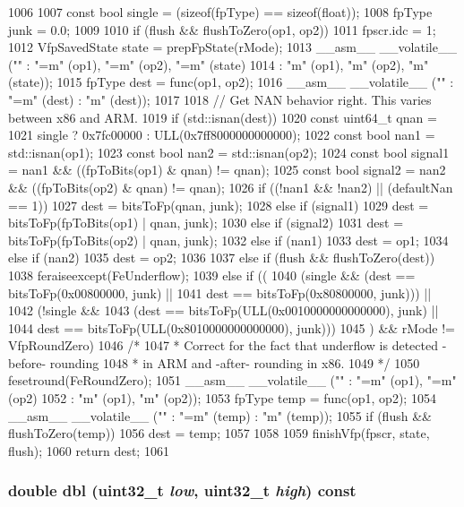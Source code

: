 \begin{DoxyCode}
1006 {
1007     const bool single = (sizeof(fpType) == sizeof(float));
1008     fpType junk = 0.0;
1009 
1010     if (flush && flushToZero(op1, op2))
1011         fpscr.idc = 1;
1012     VfpSavedState state = prepFpState(rMode);
1013     __asm__ __volatile__ ("" : "=m" (op1), "=m" (op2), "=m" (state)
1014                              : "m" (op1), "m" (op2), "m" (state));
1015     fpType dest = func(op1, op2);
1016     __asm__ __volatile__ ("" : "=m" (dest) : "m" (dest));
1017 
1018     // Get NAN behavior right. This varies between x86 and ARM.
1019     if (std::isnan(dest)) {
1020         const uint64_t qnan =
1021             single ? 0x7fc00000 : ULL(0x7ff8000000000000);
1022         const bool nan1 = std::isnan(op1);
1023         const bool nan2 = std::isnan(op2);
1024         const bool signal1 = nan1 && ((fpToBits(op1) & qnan) != qnan);
1025         const bool signal2 = nan2 && ((fpToBits(op2) & qnan) != qnan);
1026         if ((!nan1 && !nan2) || (defaultNan == 1)) {
1027             dest = bitsToFp(qnan, junk);
1028         } else if (signal1) {
1029             dest = bitsToFp(fpToBits(op1) | qnan, junk);
1030         } else if (signal2) {
1031             dest = bitsToFp(fpToBits(op2) | qnan, junk);
1032         } else if (nan1) {
1033             dest = op1;
1034         } else if (nan2) {
1035             dest = op2;
1036         }
1037     } else if (flush && flushToZero(dest)) {
1038         feraiseexcept(FeUnderflow);
1039     } else if ((
1040                 (single && (dest == bitsToFp(0x00800000, junk) ||
1041                      dest == bitsToFp(0x80800000, junk))) ||
1042                 (!single &&
1043                     (dest == bitsToFp(ULL(0x0010000000000000), junk) ||
1044                      dest == bitsToFp(ULL(0x8010000000000000), junk)))
1045                ) && rMode != VfpRoundZero) {
1046         /*
1047          * Correct for the fact that underflow is detected -before- rounding
1048          * in ARM and -after- rounding in x86.
1049          */
1050         fesetround(FeRoundZero);
1051         __asm__ __volatile__ ("" : "=m" (op1), "=m" (op2)
1052                                  : "m" (op1), "m" (op2));
1053         fpType temp = func(op1, op2);
1054         __asm__ __volatile__ ("" : "=m" (temp) : "m" (temp));
1055         if (flush && flushToZero(temp)) {
1056             dest = temp;
1057         }
1058     }
1059     finishVfp(fpscr, state, flush);
1060     return dest;
1061 }
\end{DoxyCode}
\hypertarget{classArmISA_1_1FpOp_a8b883fad84db432c4e6291c8db223e5e}{
\subsubsection[{dbl}]{\setlength{\rightskip}{0pt plus 5cm}double dbl ({\bf uint32\_\-t} {\em low}, \/  {\bf uint32\_\-t} {\em high}) const}}
\label{classArmISA_1_1FpOp_a8b883fad84db432c4e6291c8db223e5e}



